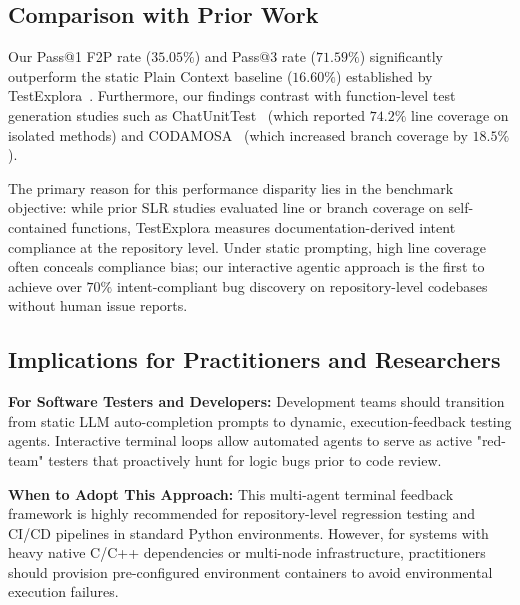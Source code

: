 \subsection{Comparison with Prior Work}
Our Pass@1 F2P rate ($35.05\%$) and Pass@3 rate ($71.59\%$) significantly outperform the static Plain Context baseline ($16.60\%$) established by TestExplora~\cite{testexplora}. Furthermore, our findings contrast with function-level test generation studies such as ChatUnitTest~\cite{xie2023chatunitest} (which reported $74.2\%$ line coverage on isolated methods) and CODAMOSA~\cite{lemieux2023codamosa} (which increased branch coverage by $18.5\%$). 

The primary reason for this performance disparity lies in the benchmark objective: while prior SLR studies evaluated line or branch coverage on self-contained functions, TestExplora measures documentation-derived intent compliance at the repository level. Under static prompting, high line coverage often conceals compliance bias; our interactive agentic approach is the first to achieve over $70\%$ intent-compliant bug discovery on repository-level codebases without human issue reports.

\subsection{Implications for Practitioners and Researchers}
\textbf{For Software Testers and Developers:} Development teams should transition from static LLM auto-completion prompts to dynamic, execution-feedback testing agents. Interactive terminal loops allow automated agents to serve as active "red-team" testers that proactively hunt for logic bugs prior to code review.

\textbf{When to Adopt This Approach:} This multi-agent terminal feedback framework is highly recommended for repository-level regression testing and CI/CD pipelines in standard Python environments. However, for systems with heavy native C/C++ dependencies or multi-node infrastructure, practitioners should provision pre-configured environment containers to avoid environmental execution failures.
